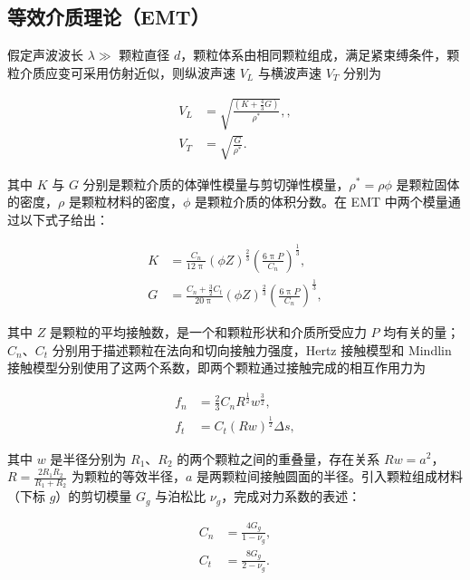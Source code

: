 \subsection{等效介质理论（EMT）}

假定声波波长 $\lambda\gg$ 颗粒直径 $d$，颗粒体系由相同颗粒组成，满足紧束缚条件，颗粒介质应变可采用仿射近似，则纵波声速 $V_{L}$ 与横波声速 $V_{T}$ 分别为

\begin{align}
  V_{L} &= \sqrt{\frac{(K+\frac{4}{3}G)}{\rho^{*}}},\label{eq:emt_velocity_L},\\
  V_{T} &= \sqrt{\frac{G}{\rho^{*}}}.\label{eq:emt_velocity_T}
\end{align}

其中 $K$ 与 $G$ 分别是颗粒介质的体弹性模量与剪切弹性模量，$\rho^{*}=\rho\phi$ 是颗粒固体的密度，$\rho$ 是颗粒材料的密度，$\phi$ 是颗粒介质的体积分数。在 EMT 中两个模量通过以下式子给出：

\begin{align}
  K &= \frac{C_{n}}{12\uppi}\left(\phi Z\right)^{\frac{2}{3}}\left(\frac{6\uppi P}{C_{n}}\right)^{\frac{1}{3}},\\
  G &= \frac{C_{n} + \frac{3}{2}C_{t}}{20\uppi}\left(\phi Z\right)^{\frac{2}{3}}\left(\frac{6\uppi P}{C_{n}}\right)^{\frac{1}{3}},
\end{align}

其中 $Z$ 是颗粒的平均接触数，是一个和颗粒形状和介质所受应力 $P$ 均有关的量\cite{vandenwildenbergProbingEffectParticle2015}；$C_{n}$、$C_{t}$ 分别用于描述颗粒在法向和切向接触力强度，Hertz 接触模型和 Mindlin 接触模型分别使用了这两个系数，即两个颗粒通过接触完成的相互作用力为

\begin{align}
  f_{n} &= \frac{2}{3}C_{n}R^{\frac{1}{2}}w^{\frac{3}{2}},\label{eq:contact_force_norm}\\
  f_{t} &= C_{t}(Rw)^{\frac{1}{2}}\Delta s\label{eq:contact_force_tan},
\end{align}

其中 $w$ 是半径分别为 $R_{1}$、$R_{2}$ 的两个颗粒之间的重叠量，存在关系 $Rw = a^2$，$R = \frac{2R_{1}R_{2}}{R_{1} + R_{2}}$ 为颗粒的等效半径，$a$ 是两颗粒间接触圆面的半径。引入颗粒组成材料（下标 $g$）的剪切模量 $G_{g}$ 与泊松比 $\nu_{g}$，完成对力系数的表述：

\begin{align}
  C_{n} &= \frac{4G_{g}}{1-\nu_{g}},\\
  C_{t} &= \frac{8G_{g}}{2-\nu_{g}}.
\end{align}

